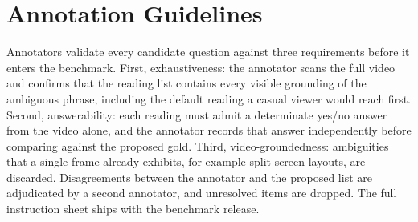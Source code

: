 \section{Annotation Guidelines}
\label{app:guidelines}

Annotators validate every candidate question against three requirements before it enters the benchmark. First, exhaustiveness: the annotator scans the full video and confirms that the reading list contains every visible grounding of the ambiguous phrase, including the default reading a casual viewer would reach first. Second, answerability: each reading must admit a determinate yes/no answer from the video alone, and the annotator records that answer independently before comparing against the proposed gold. Third, video-groundedness: ambiguities that a single frame already exhibits, for example split-screen layouts, are discarded. Disagreements between the annotator and the proposed list are adjudicated by a second annotator, and unresolved items are dropped. The full instruction sheet ships with the benchmark release.
